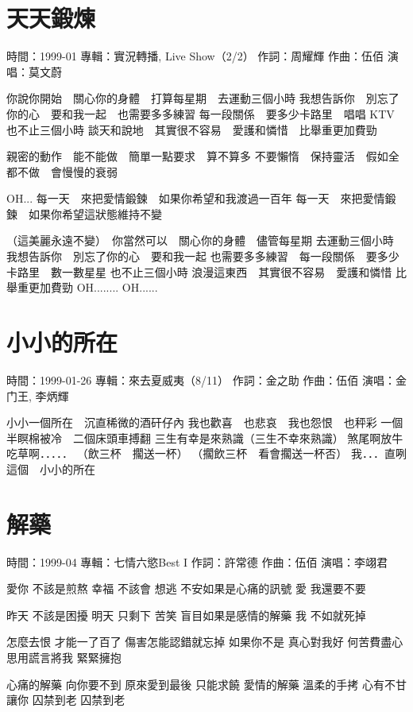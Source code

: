 \documentclass[UTF8,a4paper,oneside,twocolumn,12pt]{ctexbook}
\newcommand{\infopair}[2]{\textbullet #1：#2}
\newcommand{\zc}[1][伍佰]{\infopair{作詞}{#1}}
\newcommand{\zq}[1][伍佰]{\infopair{作曲}{#1}}
\newcommand{\zj}[1]{\infopair{專輯}{#1}}
\newcommand{\sj}[1]{\infopair{時間}{#1}}
\newenvironment{info}{\begin{flushleft}\kaishu
	}
	{\end{flushleft}\normalsize\yahei\par}
\newenvironment{lyric}{
	}
{}
\begin{document}
\section{天天鍛煉}
\begin{info}
	\sj{1999-01}
	\zj{實況轉播, Live Show（2/2）}
	\zc[周耀輝]
	\zq
	\infopair{演唱}{莫文蔚}
\end{info}
\begin{lyric}
	你說你開始　關心你的身體　打算每星期　去運動三個小時
	我想告訴你　別忘了你的心　要和我一起　也需要多多練習
	每一段關係　要多少卡路里　唱唱 KTV  也不止三個小時
	談天和說地　其實很不容易　愛護和憐惜　比舉重更加費勁

	親密的動作　能不能做　簡單一點要求　算不算多
	不要懶惰　保持靈活　假如全都不做　會慢慢的衰弱

	OH... 每一天　來把愛情鍛鍊　如果你希望和我渡過一百年
	每一天　來把愛情鍛鍊　如果你希望這狀態維持不變

	（這美麗永遠不變）　你當然可以　關心你的身體　儘管每星期
	去運動三個小時　我想告訴你　別忘了你的心　要和我一起
	也需要多多練習　每一段關係　要多少卡路里　數一數星星
	也不止三個小時  浪漫這東西　其實很不容易　愛護和憐惜
	比舉重更加費勁  OH........  OH......
\end{lyric}

\section{小小的所在}
\begin{info}
	\sj{1999-01-26}
	\zj{來去夏威夷（8/11）}
	\zc[金之助]
	\zq[伍佰]
	\infopair{演唱}{金门王, 李炳輝}
\end{info}
\begin{lyric}
	小小一個所在　沉直稀微的酒矸仔內
	我也歡喜　也悲哀　我也怨恨　也秤彩
	一個半瞑棉被冷　二個床頭車搏翻
	三生有幸是來熟識（三生不幸來熟識）
	煞尾啊放牛吃草啊．．．．．
	（飲三杯　擱送一杯）
	（擱飲三杯　看會擱送一杯否）
	我．．．直咧這個　小小的所在
\end{lyric}

\section{解藥}
\begin{info}
	\sj{1999-04}
	\zj{七情六慾Best I}
	\zc[許常德]
	\zq
	\infopair{演唱}{李翊君}
\end{info}
\begin{lyric}
	愛你 不該是煎熬 幸福 不該會 想逃
	不安如果是心痛的訊號 愛 我還要不要

	昨天 不該是困擾 明天 只剩下 苦笑
	盲目如果是感情的解藥 我 不如就死掉

	怎麼去恨 才能一了百了 傷害怎能認錯就忘掉
	如果你不是 真心對我好 何苦費盡心思用謊言將我 緊緊擁抱

	心痛的解藥 向你要不到 原來愛到最後 只能求饒
	愛情的解藥 溫柔的手拷 心有不甘讓你 囚禁到老 囚禁到老
\end{lyric}
\end{document}
